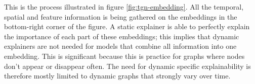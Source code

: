 This is the process illustrated in figure \ref{fig:tgn-embedding}. All the temporal, spatial and feature information is being gathered on the embeddings in the bottom-right corner of the figure. A static explainer is able to perfectly explain the importance of each part of these embeddings; this implies that dynamic explainers are not needed for models that combine all information into one embedding. This is significant because this is practice for graphs where nodes don't appear or disappear often. The need for dynamic specific explainability is therefore mostly limited to dynamic graphs that strongly vary over time.